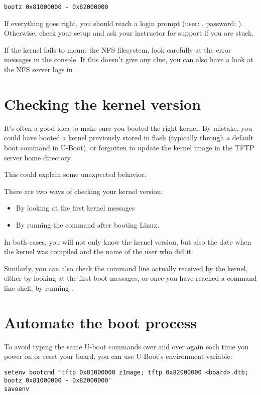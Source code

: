 \begin{verbatim}
bootz 0x81000000 - 0x82000000
\end{verbatim}

If everything goes right, you should reach a login prompt (user:
, password: ). Otherwise, check your setup and
ask your instructor for support if you are stuck.

If the kernel fails to mount the NFS filesystem, look carefully at the
error messages in the console. If this doesn't give any clue, you can
also have a look at the NFS server logs in .

\section{Checking the kernel version}

It's often a good idea to make sure you booted the right kernel.
By mistake, you could have booted a kernel previously stored in flash
(typically through a default boot command in U-Boot), or forgotten to
update the kernel image in the TFTP server home directory.

This could explain some unexpected behavior.

There are two ways of checking your kernel version:
\begin{itemize}
\item By looking at the first kernel messages
\item By running the  command after booting Linux.
\end{itemize}

In both cases, you will not only know the kernel version, but also
the date when the kernel was compiled and the name of the user who
did it.

Similarly, you can also check the command line actually received by
the kernel, either by looking at the first boot messages, or once you
have reached a command line shell, by running .

\section{Automate the boot process}

To avoid typing the same U-boot commands over and over again each time
you power on or reset your board, you can use U-Boot's 
environment variable:

{\small
\begin{verbatim}
setenv bootcmd 'tftp 0x81000000 zImage; tftp 0x82000000 <board>.dtb; bootz 0x81000000 - 0x82000000'
saveenv
\end{verbatim}
}

